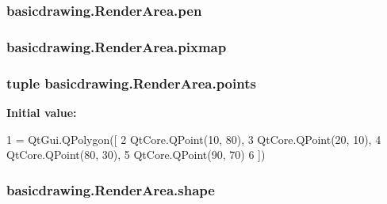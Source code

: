 \subsubsection[{pen}]{\setlength{\rightskip}{0pt plus 5cm}basicdrawing.\+Render\+Area.\+pen}\label{classbasicdrawing_1_1RenderArea_a0b897e7d17a3cf1edb136e567e4e27a1}
\hypertarget{classbasicdrawing_1_1RenderArea_a7b8a51624481c92a78f541d5cf97bf5c}{}
\subsubsection[{pixmap}]{\setlength{\rightskip}{0pt plus 5cm}basicdrawing.\+Render\+Area.\+pixmap}\label{classbasicdrawing_1_1RenderArea_a7b8a51624481c92a78f541d5cf97bf5c}
\hypertarget{classbasicdrawing_1_1RenderArea_a515dc68dcb3b8aa46ccec4e7372679e7}{}
\subsubsection[{points}]{\setlength{\rightskip}{0pt plus 5cm}tuple basicdrawing.\+Render\+Area.\+points\hspace{0.3cm}{\ttfamily [static]}}\label{classbasicdrawing_1_1RenderArea_a515dc68dcb3b8aa46ccec4e7372679e7}
{\bfseries Initial value\+:}
\begin{DoxyCode}
1 = QtGui.QPolygon([
2         QtCore.QPoint(10, 80),
3         QtCore.QPoint(20, 10),
4         QtCore.QPoint(80, 30),
5         QtCore.QPoint(90, 70)
6     ])
\end{DoxyCode}
\hypertarget{classbasicdrawing_1_1RenderArea_ab7e755c0aec4219e06e14f623e55b60b}{}
\subsubsection[{shape}]{\setlength{\rightskip}{0pt plus 5cm}basicdrawing.\+Render\+Area.\+shape}\label{classbasicdrawing_1_1RenderArea_ab7e755c0aec4219e06e14f623e55b60b}
\hypertarget{classbasicdrawing_1_1RenderArea_ad27e4611f050931113893501b25e741d}{}
